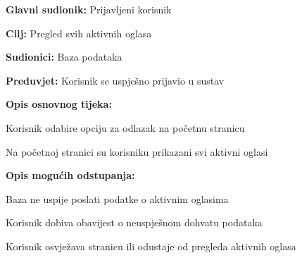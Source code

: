 					\noindent {}
					\begin{packed_item}
	
						\item \textbf{Glavni sudionik: }Prijavljeni korisnik
						\item  \textbf{Cilj:} Pregled svih aktivnih oglasa
						\item  \textbf{Sudionici:} Baza podataka
						\item  \textbf{Preduvjet:} Korisnik se uspješno prijavio u sustav
						\item  \textbf{Opis osnovnog tijeka:}
						
						\item[] \begin{packed_enum}
							\item Korisnik odabire opciju za odlazak na početnu stranicu
							\item Na početnoj stranici su korisniku prikazani svi aktivni oglasi
						\end{packed_enum}

						\item  \textbf{Opis mogućih odstupanja:}

						\item[] \begin{packed_item}
							\item[2.a] Baza ne uspije poslati podatke o aktivnim oglasima
							\item[] \begin{packed_enum}
								
								\item Korisnik dobiva obavijest o neuspješnom dohvatu podataka
								\item Korisnik osvježava stranicu ili odustaje od pregleda aktivnih oglasa
							
							\end{packed_enum}	
						\end{packed_item}
						
					\end{packed_item}


